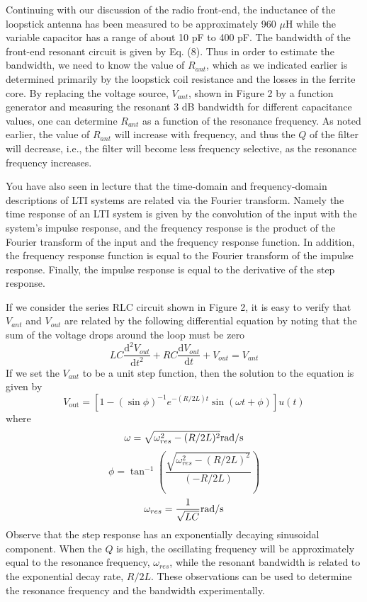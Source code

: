 \documentclass[a4paper]{article}
\begin{document}
Continuing with our discussion of the radio front-end, the inductance of the loopstick antenna has been measured to be approximately 960 $\mu$H while the variable capacitor has a range of about 10 pF to 400 pF. The bandwidth of the front-end resonant circuit is given by Eq. (8). Thus in order to estimate the bandwidth, we need to know the value of $R_{ant}$, which as we indicated earlier is determined primarily by the loopstick coil resistance and the losses in the ferrite core. By replacing the voltage source, $V_{ant}$, shown in Figure 2 by a function generator and measuring the resonant 3 dB bandwidth for different capacitance values, one can determine $R_{ant}$ as a function of the resonance frequency. As noted earlier, the value of $R_{ant}$ will increase with frequency, and thus the $Q$ of the filter will decrease, i.e., the filter will become less frequency selective, as the resonance frequency increases.

You have also seen in lecture that the time-domain and frequency-domain descriptions of LTI systems are related via the Fourier transform. Namely the time response of an LTI system is given by the convolution of the input with the system’s impulse response, and the frequency response is the product of the Fourier transform of the input and the frequency response function. In addition, the frequency response function is equal to the Fourier transform of the impulse response. Finally, the impulse response is equal to the derivative of the step response.

If we consider the series RLC circuit shown in Figure 2, it is easy to verify that $V_{ant}$ and $V_{out}$ are related by the following differential equation by noting that the sum of the voltage drops around the loop must be zero
\begin{equation}
	LC\frac{\mathrm{d}^2V_{out}}{\mathrm{d}t^2}+RC\frac{\mathrm{d}V_{out}}{\mathrm{d}t}+V_{out}=V_{ant}
\end{equation}
If we set the $V_{ant}$ to be a unit step function, then the solution to the equation is given by
$$V_\text{out}=[1-(\sin\phi)^{-1}e^{-(R/2L)t}\sin(\omega t+\phi)]u(t)$$
where
$$\omega=\sqrt{\omega_{res}^2-(R/2L)^2}\rm{rad/s}$$
$$\phi = \tan^{-1}(\frac{\sqrt{\omega_{res}^2-(R/2L)^2}}{(-R/2L)})$$
$$\omega_{res}=\frac{1}{\sqrt{LC}}\rm{rad/s}$$
Observe that the step response has an exponentially decaying sinusoidal component. When the $Q$ is high, the oscillating frequency will be approximately equal to the resonance frequency, $\omega_{res}$, while the resonant bandwidth is related to the exponential decay rate, $R/2L$. These observations can be used to determine the resonance frequency and the bandwidth experimentally.
\end{document}

